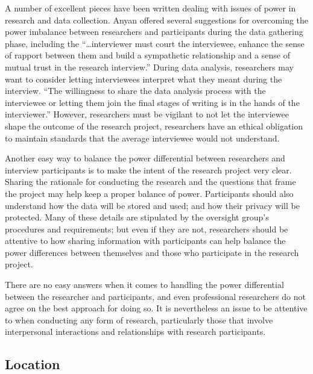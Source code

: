 A number of excellent pieces have been written dealing with issues of power in research and data collection. Anyan \cite{anyan2013influence} offered several suggestions for overcoming the power imbalance between researchers and participants during the data gathering phase, including the ``\ldots interviewer must court the interviewee, enhance the sense of rapport between them and build a sympathetic relationship and a sense of mutual trust in the research interview.'' During data analysis, researchers may want to consider letting interviewees interpret what they meant during the interview. ``The willingness to share the data analysis process with the interviewee or letting them join the final stages of writing is in the hands of the interviewer.'' However, researchers must be vigilant to not let the interviewee shape the outcome of the research project, researchers have an ethical obligation to maintain standards that the average interviewee would not understand.

Another easy way to balance the power differential between researchers and interview participants is to make the intent of the research project very clear. Sharing the rationale for conducting the research and the questions that frame the project may help keep a proper balance of power. Participants should also understand how the data will be stored and used; and how their privacy will be protected. Many of these details are stipulated by the oversight group's procedures and requirements; but even if they are not, researchers should be attentive to how sharing information with participants can help balance the power differences between themselves and those who participate in the research project.

There are no easy answers when it comes to handling the power differential between the researcher and participants, and even professional researchers do not agree on the best approach for doing so. It is nevertheless an issue to be attentive to when conducting any form of research, particularly those that involve interpersonal interactions and relationships with research participants.

\subsection{Location}

